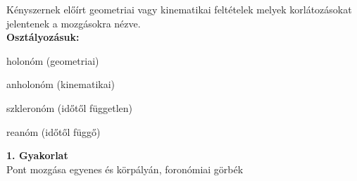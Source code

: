 \begin{tcolorbox}[colback=MidnightBlue!5!white,colframe=MidnightBlue!60!black,title= Definíció]
    Kényszernek előírt geometriai vagy kinematikai feltételek melyek korlátozásokat jelentenek a mozgásokra nézve.\\
    \textbf{Osztályozásuk:}
    \begin{itemize}
        \begin{multicols}{2}
        \item holonóm (geometriai)
        \item anholonóm (kinematikai)
        
        \columnbreak
        \item szkleronóm (időtől független)
        \item reanóm (időtől függő)
        \end{multicols}
    \end{itemize}
\end{tcolorbox}
\newpage
\begin{center}
    \large \textbf{1. Gyakorlat}\\
    Pont mozgása egyenes és körpályán, foronómiai görbék
\end{center}
